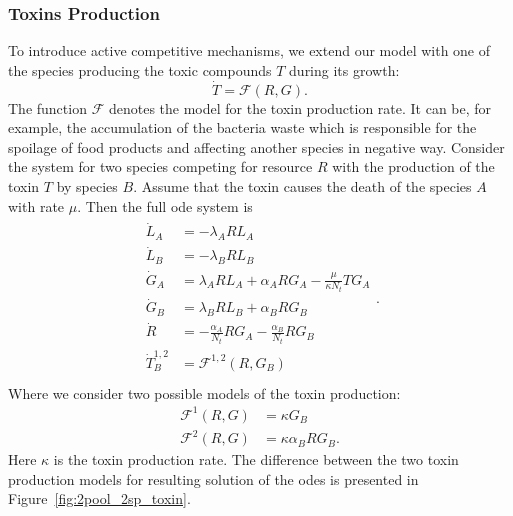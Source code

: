 \documentclass[10pt,A4paper]{article}
\numberwithin{equation}{section}
\begin{document}
\subsubsection{Toxins Production}
To introduce active competitive mechanisms, we extend our model with one of the species producing the toxic compounds $T$ during its growth:
\begin{equation}
    \dot{T} = \mathcal{F}(R,G).
\end{equation}
The function $\mathcal{F}$ denotes the model for the toxin production rate.
It can be, for example, the accumulation of the bacteria waste which is responsible for the spoilage of food products and affecting another species in negative way.
Consider the system for two species competing for resource $R$ with the production of the toxin $T$ by species $B$.
Assume that the toxin causes the death of the species $A$ with rate $\mu$.
Then the full \ac{ode} system is
\begin{align}
    \begin{split}
        \dot{L}_A &= - \lambda_A R L_A\\
        \dot{L}_B &= - \lambda_B R L_B \\
        \dot{G}_A &= \lambda_A R L_A + \alpha_A R G_A - \frac{\mu}{\kappa N_t} T G_A\\
        \dot{G}_B &= \lambda_B R L_B + \alpha_B R G_B\\ 
        \dot{R} &= -\frac{\alpha_A}{N_t} R G_A-\frac{\alpha_B}{N_t} R G_B\\
        \dot{T}_{B}^{1,2} &= \mathcal{F}^{1,2} (R, G_B) \\
    \end{split}.
    \label{eq:model_2sp_toxin}
\end{align}
%
Where we consider two possible models of the toxin production:
\begin{align}
    \mathcal{F}^1(R,G)&=\kappa G_B\\
    \mathcal{F}^2(R,G)&=\kappa\alpha_B R G_B.
\end{align}
Here $\kappa$ is the toxin production rate.
The difference between the two toxin production models for resulting solution of the \acp{ode} is presented in Figure~\ref{fig:2pool_2sp_toxin}.
%
%
\end{document}
